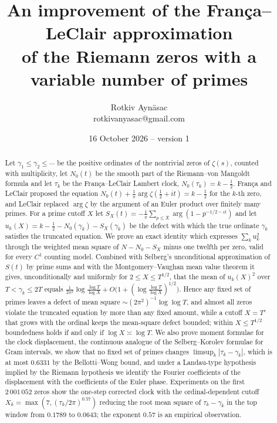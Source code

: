 \documentclass[11pt,reqno]{amsart}
\numberwithin{equation}{section}
\theoremstyle{plain}
\theoremstyle{definition}
\theoremstyle{remark}
\newcommand{\NO}{N_0}
\providecommand{\NoCaseChange}[1]{\lowercase{#1}}
\begin{document}
\title[Variable prime cutoffs in the Fran\c{c}a--LeClair equation]{An improvement of the Fran\c{c}a--LeClair approximation\\ of the Riemann zeros with a variable number of primes}
\author{Rotkiv Ayn\"asac\\[2pt]{\normalfont\NoCaseChange{ROTKIVANYASAC@GMAIL.COM}}}
\date{16 October 2026 -- version 1}

\begin{abstract}
Let $\gamma_1\le\gamma_2\le\cdots$ be the positive ordinates of the nontrivial zeros of $\zeta(s)$, counted with multiplicity, let $\NO(t)$ be the smooth part of the Riemann--von Mangoldt formula and let $\tau_k$ be the Fran\c{c}a--LeClair Lambert clock, $\NO(\tau_k)=k-\frac12$. Fran\c{c}a and LeClair proposed the equation $\NO(t)+\frac1\pi\arg\zeta(\frac12+it)=k-\frac12$ for the $k$-th zero, and LeClair replaced $\arg\zeta$ by the argument of an Euler product over finitely many primes. For a prime cutoff $X$ let $S_X(t)=-\frac1\pi\sum_{p\le X}\arg(1-p^{-1/2-it})$ and let $u_k(X)=k-\frac12-\NO(\gamma_k)-S_X(\gamma_k)$ be the defect with which the true ordinate $\gamma_k$ satisfies the truncated equation. We prove an exact identity which expresses $\sum_k u_k^2$ through the weighted mean square of $N-\NO-S_X$ minus one twelfth per zero, valid for every $C^1$ counting model. Combined with Selberg's unconditional approximation of $S(t)$ by prime sums and with the Montgomery--Vaughan mean value theorem it gives, unconditionally and uniformly for $2\le X\le T^{1/2}$, that the mean of $u_k(X)^2$ over $T<\gamma_k\le2T$ equals $\frac1{2\pi^2}\log\frac{\log T}{\log X}+O\bigl(1+(\log\frac{\log T}{\log X})^{1/2}\bigr)$. Hence any fixed set of primes leaves a defect of mean square $\sim(2\pi^2)^{-1}\log\log T$, and almost all zeros violate the truncated equation by more than any fixed amount, while a cutoff $X=T^c$ that grows with the ordinal keeps the mean-square defect bounded; within $X\le T^{1/2}$ boundedness holds if and only if $\log X\asymp\log T$. We also prove moment formulae for the clock displacement, the continuous analogue of the Selberg--Korolev formulae for Gram intervals, we show that no fixed set of primes changes $\limsup_k|\tau_k-\gamma_k|$, which is at most $0.6331$ by the Bellotti--Wong bound, and under a Landau-type hypothesis implied by the Riemann hypothesis we identify the Fourier coefficients of the displacement with the coefficients of the Euler phase. Experiments on the first $2\,001\,052$ zeros show the one-step corrected clock with the ordinal-dependent cutoff $X_k=\max(7,(\tau_k/2\pi)^{0.57})$ reducing the root mean square of $\tau_k-\gamma_k$ in the top window from $0.1789$ to $0.0643$; the exponent $0.57$ is an empirical observation.
\end{abstract}
\end{document}
